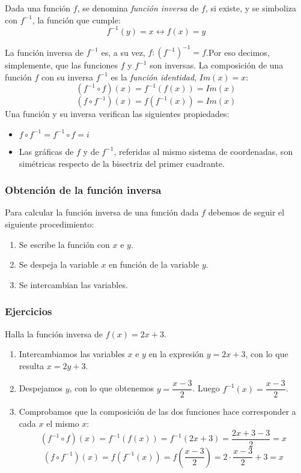 
\begin{definition}
Dada una función $f$, se denomina \emph{función inversa} de $f$, si existe, y se simboliza con $f^{-1}$, la función que cumple:
$$f^{-1}(y) = x \longleftrightarrow f(x) = y$$
\end{definition}
La función inversa de $f^{-1}$ es, a su vez, $f: (f^{-1})^{-1}=f$.Por eso decimos, simplemente, que las funciones $f$ y $f^{-1}$ son inversas.
La composición de una función $f$ con su inversa $f^{-1}$ es la \emph{función identidad}, $Im(x)=x$:
$$(f^{-1} \circ f)(x) = f^{-1}(f(x)) = Im(x)$$
$$(f \circ f^{-1})(x) =f(f^{-1}(x))=Im(x)$$
Una función y su inversa verifican las siguientes propiedades:\\
\begin{itemize}
	\item $f \circ f^{-1} = f^{-1} \circ f = i$
	\item Las gráficas de $f$ y de $f^{-1}$, referidas al mismo sistema de coordenadas, son simétricas respecto de la bisectriz del primer cuadrante.
\end{itemize}
\subsubsection{Obtención de la función inversa}
Para calcular la función inversa de una función dada $f$ debemos de seguir el siguiente procedimiento:
\begin{enumerate}
	\item Se escribe la función con $x$ e $y$.
	\item Se despeja la variable $x$ en función de la variable $y$.
	\item Se intercambian las variables.
\end{enumerate}

\subsubsection{Ejercicios}
\begin{ex}
	Halla la función inversa de $f(x)=2x+3$.
	\begin{sol}
		\begin{enumerate}
			\item Intercambiamos las variables $x$ e $y$ en la expresión $y=2x+3$, con lo que resulta $x=2y+3$.
			\item Despejamos $y$, con lo que obtenemos $y=\dfrac{x-3}{2}$. Luego $f^{-1}(x)=\dfrac{x-3}{2}$.
			\item Comprobamos que la composición de las dos funciones hace corresponder a cada $x$ el mismo $x$:
			$$(f^{-1} \circ f)(x) = f^{-1}(f(x)) = f^{-1}(2x+3) = \dfrac{2x + 3 - 3}{2} = x$$
			$$(f \circ f^{-1})(x) = f(f^{-1}(x)) = f(\dfrac{x-3}{2}) =2 \cdot \dfrac{x-3}{2} + 3 = x$$
		\end{enumerate}
	\end{sol}
\end{ex}

